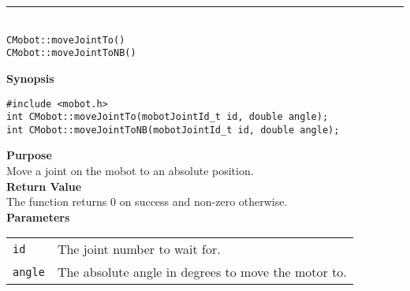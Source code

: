 \noindent
\vspace{5pt}
\rule{4.5in}{0.015in}\\
\noindent
{\LARGE \texttt{CMobot::moveJointTo()}}\\
{\LARGE \texttt{CMobot::moveJointToNB()}}\\
{}

\noindent
{\bf Synopsis}
\vspace{-8pt}
\begin{verbatim}
#include <mobot.h>
int CMobot::moveJointTo(mobotJointId_t id, double angle);
int CMobot::moveJointToNB(mobotJointId_t id, double angle);
\end{verbatim}

\noindent
{\bf Purpose}\\
Move a joint on the mobot to an absolute position.\\

\noindent
{\bf Return Value}\\
The function returns 0 on success and non-zero otherwise.\\

\noindent
{\bf Parameters}\\
\vspace{-0.1in}
\begin{description}
\item               
\begin{tabular}{p{10 mm}p{145 mm}}
\texttt{id} & The joint number to wait for. \\
\texttt{angle} & The absolute angle in degrees to move the motor to.  \\
\end{tabular}
\end{description}

